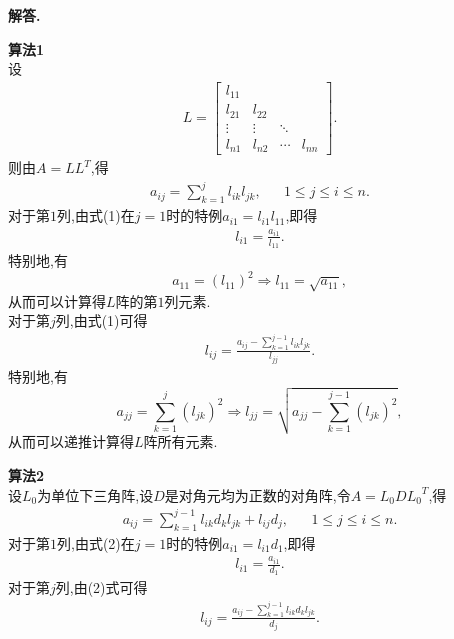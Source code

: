 \documentclass[12pt, a4paper, oneside, UTF8]{ctexart}
\newenvironment{solution}{\par\noindent\textbf{解答. }}{\par}
\begin{document}
\begin{solution}
    \par \textbf{算法1}\\
        设
        \begin{align*}
            L=
            \left[
            	\begin{array}{cccc}	
            	l_{11}\\	
            	l_{21} & l_{22} \\	 
                \vdots & \vdots & \ddots \\
           	  	l_{n1} & l_{n2} & \cdots & l_{nn}
            	\end{array}
            \right].
        \end{align*}
        则由$A=LL^T$,得
        \begin{align}
            a_{ij}=\sum\limits_{k=1}^{j}{l_{ik}}{l_{jk}},&&{1}\leq{j}\leq{i}\leq{n}.
        \end{align}
        对于第$1$列,由式(1)在$j=1$时的特例$a_{i1}=l_{i1}l_{11}$,即得
        \begin{align*}
            l_{i1}=\frac{a_{i1}}{l_{11}}.
        \end{align*}
        特别地,有$$a_{11}=(l_{11})^2\Rightarrow{l_{11}}=\sqrt{a_{11}},$$
        从而可以计算得$L$阵的第$1$列元素.\\
        对于第$j$列,由式(1)可得
        \begin{align*}
            l_{ij}=\frac{a_{ij}-\sum\limits_{k=1}^{j-1}l_{ik}l_{jk}}{l_{jj}}.
        \end{align*}
        特别地,有$$a_{jj}=\sum\limits_{k=1}^{j}{(l_{jk})^2}\Rightarrow{l_{jj}=\sqrt{a_{jj}-\sum\limits_{k=1}^{j-1}(l_{jk})^2}},$$
        从而可以递推计算得$L$阵所有元素.
    \par \textbf{算法2}\\
        设$L_0$为单位下三角阵,设$D$是对角元均为正数的对角阵,令$A={L_0}D{L_0}^{T}$,得
        \begin{align}
            a_{ij}=\sum_{k=1}^{j-1}{l_{ik}d_{k}l_{jk}}+l_{ij}d_{j},&&{1}\leq{j}\leq{i}\leq{n}.
        \end{align}
        对于第$1$列,由式(2)在$j=1$时的特例$a_{i1}=l_{i1}d_{1}$,即得
        \begin{align*}
            l_{i1}=\frac{a_{i1}}{d_{1}}.
        \end{align*}
        对于第$j$列,由(2)式可得
        \begin{align*}
            l_{ij}=\frac{a_{ij}-\sum\limits_{k=1}^{j-1}{l_{ik}d_{k}l_{jk}}}{d_{j}}.

\end{align*}
\end{solution}
\end{document}
